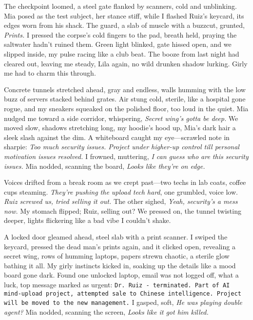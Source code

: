 \documentclass[12pt,oneside]{book}
\newcommand{\note}[1]{\texttt{#1}}
\begin{document}
The checkpoint loomed, a steel gate flanked by scanners, cold and unblinking. Mia posed as the test subject, her stance stiff, while I flashed Ruiz’s keycard, its edges worn from his shack. The guard, a slab of muscle with a buzzcut, grunted, \textit{Prints.} I pressed the corpse’s cold fingers to the pad, breath held, praying the saltwater hadn’t ruined them. Green light blinked, gate hissed open, and we slipped inside, my pulse racing like a club beat. The booze from last night had cleared out, leaving me steady, Lila again, no wild drunken shadow lurking. Girly me had to charm this through.

Concrete tunnels stretched ahead, gray and endless, walls humming with the low buzz of servers stacked behind grates. Air stung cold, sterile, like a hospital gone rogue, and my sneakers squeaked on the polished floor, too loud in the quiet. Mia nudged me toward a side corridor, whispering, \textit{Secret wing’s gotta be deep.} We moved slow, shadows stretching long, my hoodie’s hood up, Mia’s dark hair a sleek slash against the dim. A whiteboard caught my eye—scrawled note in sharpie: \textit{Too much security issues. Project under higher-up control till personal motivation issues resolved.} I frowned, muttering, \textit{I can guess who are this security issues.} Mia nodded, scanning the board, \textit{Looks like they’re on edge.}

Voices drifted from a break room as we crept past—two techs in lab coats, coffee cups steaming. \textit{They’re pushing the upload tech hard}, one grumbled, voice low. \textit{Ruiz screwed us, tried selling it out.} The other sighed, \textit{Yeah, security’s a mess now.} My stomach flipped; Ruiz, selling out? We pressed on, the tunnel twisting deeper, lights flickering like a bad vibe I couldn’t shake.

A locked door gleamed ahead, steel slab with a print scanner. I swiped the keycard, pressed the dead man’s prints again, and it clicked open, revealing a secret wing, rows of humming laptops, papers strewn chaotic, a sterile glow bathing it all. My girly instincts kicked in, soaking up the details like a mood board gone dark. Found one unlocked laptop, email was not logged off, what a luck, top message marked as urgent: \note{Dr. Ruiz - terminated. Part of AI mind-upload project, attempted sale to Chinese intelligence. Project will be moved to the new management.} I gasped, soft, \textit{He was playing double agent?} Mia nodded, scanning the screen, \textit{Looks like it got him killed.}
\end{document}
